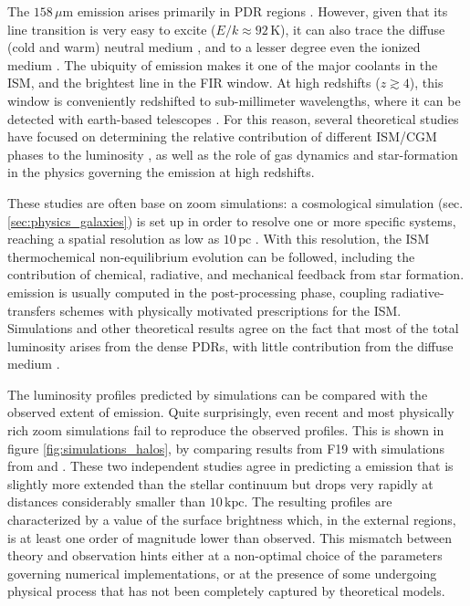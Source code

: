 The $158\,\mu\mathrm{m}$ \CII emission arises primarily in PDR regions \citep{hollenbach1999}. However, given that its line transition is very easy to excite ($E/k \approx 92\,\mathrm{K}$), it can also trace the diffuse (cold and warm) neutral medium \citep{wolfire2003}, and to a lesser degree even the ionized medium \citep{cormier2012}. The ubiquity of \CII emission makes it one of the major coolants in the ISM, and the brightest line in the FIR window. At high redshifts ($z\gtrsim 4$), this window is conveniently redshifted to sub-millimeter wavelengths, where it can be detected with earth-based telescopes \citep{bethermin:2019}. For this reason, several theoretical studies have focused on determining the relative contribution of different ISM/CGM phases to the \CII luminosity \citep{vallini2015, pallottini2017, pallottini:2019}, as well as the role of gas dynamics \citep{kohandel:2019} and star-formation \citep{vallini2017, ferrara:2019} in the physics governing the \CII emission at high redshifts.

These studies are often base on zoom simulations: a cosmological simulation (sec. \ref{sec:physics_galaxies}) is set up in order to resolve one or more specific systems, reaching a spatial resolution as low as $10\,\mathrm{pc}$ \citep[e.g.][]{pallottini:2019}. With this resolution, the ISM thermochemical non-equilibrium evolution can be followed, including the contribution of chemical, radiative, and mechanical feedback from star formation. \CII emission is usually computed in the post-processing phase, coupling radiative-transfers schemes with physically motivated prescriptions for the ISM. Simulations and other theoretical results agree on the fact that most of the total \CII luminosity arises from the dense PDRs, with little contribution from the diffuse medium \citep[e.g.,][]{vallini2015, pallottini2017}. 


The \CII luminosity profiles predicted by simulations can be compared with the observed extent of \CII emission. Quite surprisingly, even recent and most physically rich zoom simulations fail to reproduce the observed \CII profiles. This is shown in figure \ref{fig:simulations_halos}, by comparing results from F19 \citep{Fujimoto19} with simulations from \citet{pallottini2017b} and \citet{Arata:2019}. These two independent studies agree in predicting a \CII emission that is slightly more extended than the stellar continuum but drops very rapidly at distances considerably smaller than $10\,\mathrm{kpc}$. The resulting profiles are characterized by a value of the surface brightness which, in the external regions, is at least one order of magnitude lower than observed. This mismatch between theory and observation hints either at a non-optimal choice of the parameters governing numerical implementations, or at the presence of some undergoing physical process that has not been completely captured by theoretical models. 


